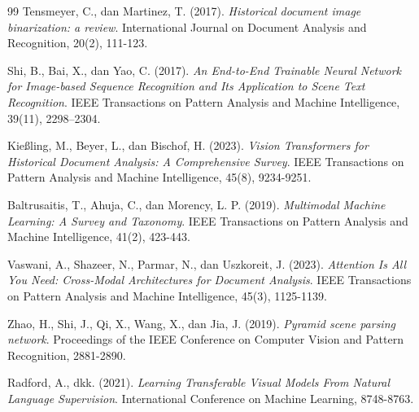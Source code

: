 \documentclass[12pt,a4paper]{book}
\begin{document}
\begin{thebibliography}{99}
Tensmeyer, C., dan Martinez, T. (2017).
\textit{Historical document image binarization: a review}.
International Journal on Document Analysis and Recognition, 20(2), 111-123.


Shi, B., Bai, X., dan Yao, C. (2017).
\textit{An End-to-End Trainable Neural Network for Image-based Sequence Recognition and Its Application to Scene Text Recognition}.
IEEE Transactions on Pattern Analysis and Machine Intelligence, 39(11), 2298--2304.

Kießling, M., Beyer, L., dan Bischof, H. (2023).
\textit{Vision Transformers for Historical Document Analysis: A Comprehensive Survey}.
IEEE Transactions on Pattern Analysis and Machine Intelligence, 45(8), 9234-9251.


Baltrusaitis, T., Ahuja, C., dan Morency, L. P. (2019).
\textit{Multimodal Machine Learning: A Survey and Taxonomy}.
IEEE Transactions on Pattern Analysis and Machine Intelligence, 41(2), 423-443.

Vaswani, A., Shazeer, N., Parmar, N., dan Uszkoreit, J. (2023).
\textit{Attention Is All You Need: Cross-Modal Architectures for Document Analysis}.
IEEE Transactions on Pattern Analysis and Machine Intelligence, 45(3), 1125-1139.


Zhao, H., Shi, J., Qi, X., Wang, X., dan Jia, J. (2019).
\textit{Pyramid scene parsing network}.
Proceedings of the IEEE Conference on Computer Vision and Pattern Recognition, 2881-2890.


Radford, A., dkk. (2021).
\textit{Learning Transferable Visual Models From Natural Language Supervision}.
International Conference on Machine Learning, 8748-8763.


\end{thebibliography}
\end{document}
